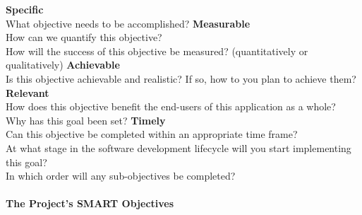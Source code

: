 \documentclass{article}
\begin{document}
\begin{outline}
    \1 \textbf{Specific}\\
    What objective needs to be accomplished?
    \1 \textbf{Measurable}\\
    How can we quantify this objective?\\
    How will the success of this objective be measured? (quantitatively or qualitatively)
    \1 \textbf{Achievable}\\
    Is this objective achievable and realistic? If so, how to you plan to achieve them?
    \1 \textbf{Relevant}\\
    How does this objective benefit the end-users of this application as a whole?\\
    Why has this goal been set?
    \1 \textbf{Timely}\\
    Can this objective be completed within an appropriate time frame?\\
    At what stage in the software development lifecycle will you start implementing this goal?\\
    In which order will any sub-objectives be completed? 
\end{outline}

\paragraph{The Project's SMART Objectives}
\end{document}
